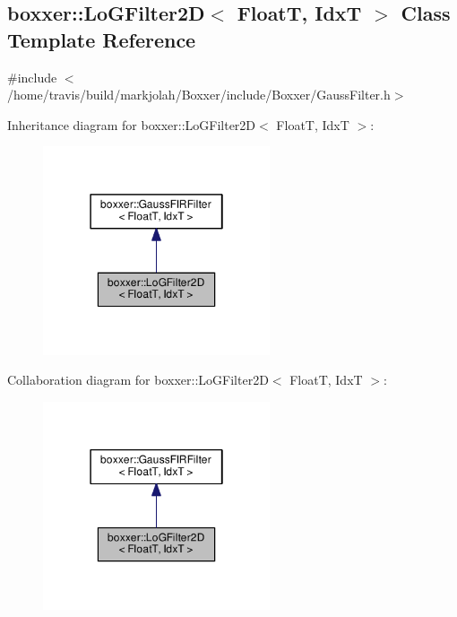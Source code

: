 \hypertarget{classboxxer_1_1LoGFilter2D}{}\subsection{boxxer\+:\+:Lo\+G\+Filter2D$<$ FloatT, IdxT $>$ Class Template Reference}
\label{classboxxer_1_1LoGFilter2D}


{\ttfamily \#include $<$/home/travis/build/markjolah/\+Boxxer/include/\+Boxxer/\+Gauss\+Filter.\+h$>$}



Inheritance diagram for boxxer\+:\+:Lo\+G\+Filter2D$<$ FloatT, IdxT $>$\+:\nopagebreak
\begin{figure}[H]
\begin{center}
\leavevmode
\includegraphics[width=190pt]{classboxxer_1_1LoGFilter2D__inherit__graph}
\end{center}
\end{figure}


Collaboration diagram for boxxer\+:\+:Lo\+G\+Filter2D$<$ FloatT, IdxT $>$\+:\nopagebreak
\begin{figure}[H]
\begin{center}
\leavevmode
\includegraphics[width=190pt]{classboxxer_1_1LoGFilter2D__coll__graph}
\end{center}
\end{figure}
